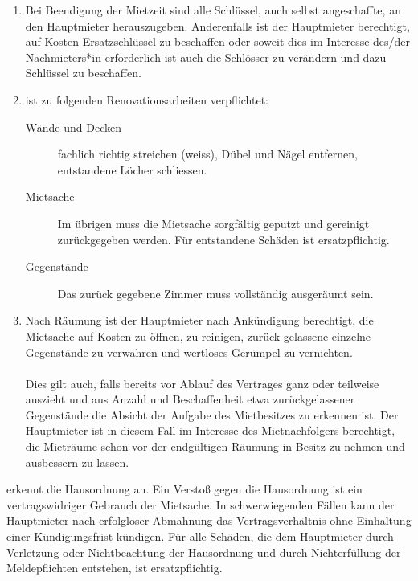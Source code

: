 \documentclass{scrreprt}[12pt,a4paper,twoside,duplex]
\begin{document}
\begin{contract}
\label{clause:rueckgabe}
\begin{enumerate}
	\item Bei Beendigung der Mietzeit sind alle Schlüssel, auch selbst angeschaffte, an den Hauptmieter herauszugeben. Anderenfalls ist der Hauptmieter berechtigt, auf Kosten  Ersatzschlüssel zu beschaffen oder soweit dies im Interesse des/der Nachmieters*in erforderlich ist auch die Schlösser zu verändern und dazu Schlüssel zu beschaffen.

	\item {} ist zu folgenden Renovationsarbeiten verpflichtet:
	\begin{description}
		\item[Wände und Decken] fachlich richtig streichen (weiss), Dübel und Nägel entfernen, entstandene Löcher schliessen.
		
		\item[Mietsache] Im übrigen muss die Mietsache sorgfältig geputzt und gereinigt zu\-rück\-ge\-ge\-ben werden. Für entstandene Schäden ist  ersatzpflichtig.
		
		\item[Gegenstände] Das zurück gegebene Zimmer muss vollständig ausgeräumt sein.
	\end{description}

	\item Nach Räumung ist der Hauptmieter nach Ankündigung berechtigt, die Mietsache auf Kosten  zu öffnen, zu reinigen, zurück gelassene einzelne Gegenstände zu verwahren und wertloses Gerümpel zu vernichten.\\ \\ Dies gilt auch, falls  bereits vor Ablauf des Vertrages ganz oder teilweise auszieht und aus Anzahl und Beschaffenheit etwa zurückgelassener Gegenstände die Absicht der Aufgabe des Mietbesitzes zu erkennen ist. Der Hauptmieter ist in diesem Fall im Interesse des Mietnachfolgers berechtigt, die Mieträume schon vor der endgültigen Räumung in Besitz zu nehmen und ausbessern zu lassen.
\end{enumerate}
\end{contract}

\begin{contract}
\label{clause:hasuordnung}
 erkennt die Hausordnung an. Ein Versto{\ss} gegen die Hausordnung ist ein vertragswidriger Gebrauch der Mietsache. In schwerwiegenden Fällen kann der Hauptmieter nach erfolgloser Abmahnung das
Vertragsverhältnis ohne Einhaltung einer Kündigungsfrist kündigen. Für alle Schäden, die dem Hauptmieter durch Verletzung oder Nichtbeachtung der Hausordnung und durch Nichterfüllung der Meldepflichten entstehen, ist  ersatzpflichtig.
\end{contract}
\end{document}
